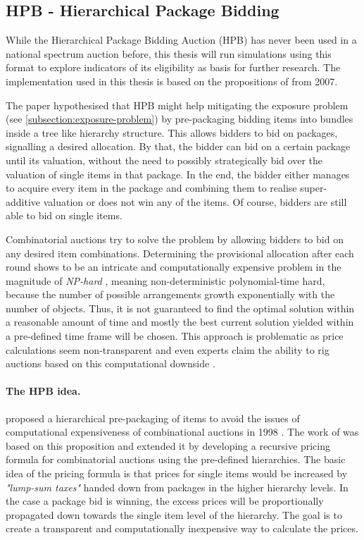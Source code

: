 \subsection{HPB - Hierarchical Package Bidding}\label{subsection:hpb_theory}
While the Hierarchical Package Bidding Auction (HPB) has never been used in a national spectrum auction before, this thesis will run simulations using this format to explore indicators of its eligibility as basis for further research. The implementation used in this thesis is based on the propositions of \citeauthor{Goeree2010} from 2007.

The paper hypothesised that HPB might help mitigating the exposure problem (see \autoref{subsection:exposure-problem}) by pre-packaging bidding items into bundles inside a tree like hierarchy structure. This allows bidders to bid on packages, signalling a desired allocation. By that, the bidder can bid on a certain package until its valuation, without the need to possibly strategically bid over the valuation of single items in that package. In the end, the bidder either manages to acquire every item in the package and combining them to realise super-additive valuation or does not win any of the items. Of course, bidders are still able to bid on single items. 

Combinatorial auctions try to solve the problem by allowing bidders to bid on any desired item combinations. Determining the provisional allocation after each round shows to be an intricate and computationally expensive problem in the magnitude of \textit{NP-hard} \cite{Goeree2010}, meaning non-deterministic polynomial-time hard, because the number of possible arrangements growth exponentially with the number of objects. Thus, it is not guaranteed to find the optimal solution within a reasonable amount of time and mostly the best current solution yielded within a pre-defined time frame will be chosen. This approach is problematic as price calculations seem non-transparent and even experts claim the ability to rig auctions based on this computational downside  \cite{Goeree2010}.

\paragraph{The HPB idea.} \citeauthor{Rothkopf1998} proposed a hierarchical pre-packaging of items to avoid the issues of computational expensiveness of combinational auctions in 1998 \cite{Rothkopf1998}. The work of \citeauthor{Goeree2010} was based on this proposition and extended it by developing a recursive pricing formula for combinatorial auctions using the pre-defined hierarchies. The basic idea of the pricing formula is that prices for single items would be increased by \textit{"lump-sum taxes"} handed down from packages in the higher hierarchy levels. In the case a package bid is winning, the excess prices will be proportionally propagated down towards the single item level of the hierarchy. The goal is to create a transparent and computationally inexpensive way to calculate the prices.

